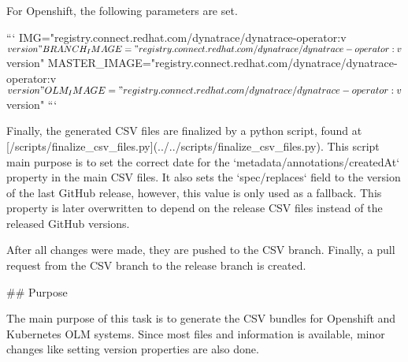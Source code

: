 For Openshift, the following parameters are set.

```
IMG="registry.connect.redhat.com/dynatrace/dynatrace-operator:v${version}"
BRANCH_IMAGE="registry.connect.redhat.com/dynatrace/dynatrace-operator:v${version}"
MASTER_IMAGE="registry.connect.redhat.com/dynatrace/dynatrace-operator:v${version}"
OLM_IMAGE="registry.connect.redhat.com/dynatrace/dynatrace-operator:v${version}"
```

Finally, the generated CSV files are finalized by a python script, found at [/scripts/finalize_csv_files.py](../../scripts/finalize_csv_files.py).
This script main purpose is to set the correct date for the `metadata/annotations/createdAt` property in the main CSV files.
It also sets the `spec/replaces` field to the version of the last GitHub release, however, this value is only used as a fallback.
This property is later overwritten to depend on the release CSV files instead of the released GitHub versions.

After all changes were made, they are pushed to the CSV branch.
Finally, a pull request from the CSV branch to the release branch is created.

## Purpose

The main purpose of this task is to generate the CSV bundles for Openshift and Kubernetes OLM systems.
Since most files and information is available, minor changes like setting version properties are also done.
